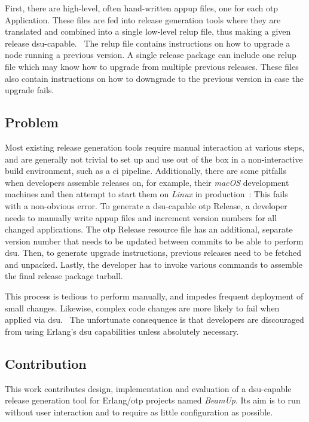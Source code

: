 First, there are high-level, often hand-written \acrfull{appup} files, one for each \acrshort{otp} Application. These files are fed into release generation tools where they are translated and combined into a single low-level \acrshort{relup} file, thus making a given release \acrshort{dsu}-capable.~\cite{doc:otp} The \acrshort{relup} file contains instructions on how to upgrade a node running a previous version. A single release package can include one \acrshort{relup} file which may know how to upgrade from multiple previous releases. These files also contain instructions on how to downgrade to the previous version in case the upgrade fails.~\cite{doc:otp}

\subsection{Problem}\label{sec:problem} Most existing release generation tools require manual interaction at various steps, and are generally not trivial to set up and use out of the box in a non-interactive build environment, such as a \acrfull{ci} pipeline. Additionally, there are some pitfalls when developers assemble releases on, for example, their \emph{macOS} development machines and then attempt to start them on \emph{Linux} in production~\cite{cesarini:otp}: This fails with a non-obvious error. To generate a \acrshort{dsu}-capable \acrshort{otp} Release, a developer needs to manually write \acrshort{appup} files and increment version numbers for all changed applications. The \acrshort{otp} Release resource file has an additional, separate version number that needs to be updated between commits to be able to perform \acrshort{dsu}. Then, to generate upgrade instructions, previous releases need to be fetched and unpacked. Lastly, the developer has to invoke various commands to assemble the final release package tarball.~\cite{ferd}

This process is tedious to perform manually, and impedes frequent deployment of small changes. Likewise, complex code changes are more likely to fail when applied via \acrshort{dsu}.~\cite{hicks} The unfortunate consequence is that developers are discouraged from using Erlang's \acrshort{dsu} capabilities unless absolutely necessary.~\cite{ferd}

\subsection{Contribution}

This work contributes design, implementation and evaluation of a \acrshort{dsu}-capable release generation tool for Erlang/\acrshort{otp} projects named \emph{BeamUp}. Its aim is to run without user interaction and to require as little configuration as possible.

